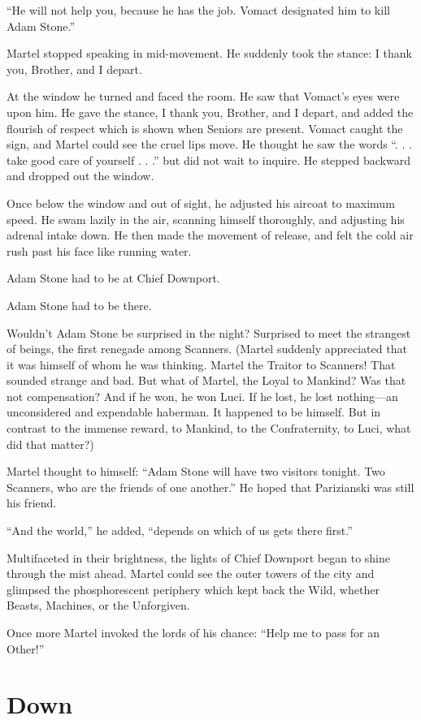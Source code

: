 ``He will not help you, because he has the job. Vomact designated him to kill Adam Stone.''

Martel stopped speaking in mid-movement. He suddenly took the stance: I thank you, Brother, and I depart.

At the window he turned and faced the room. He saw that Vomact's eyes were upon him. He gave the stance, I thank you, Brother, and I depart, and added the flourish of respect which is shown when Seniors are present. Vomact caught the sign, and Martel could see the cruel lips move. He thought he saw the words ``. . . take good care of yourself . . .'' but did not wait to inquire. He stepped backward and dropped out the window.

Once below the window and out of sight, he adjusted his aircoat to maximum speed. He swam lazily in the air, scanning himself thoroughly, and adjusting his adrenal intake down. He then made the movement of release, and felt the cold air rush past his face like running water.

Adam Stone had to be at Chief Downport.

Adam Stone had to be there.

Wouldn't Adam Stone be surprised in the night? Surprised to meet the strangest of beings, the first renegade among Scanners. (Martel suddenly appreciated that it was himself of whom he was thinking. Martel the Traitor to Scanners! That sounded strange and bad. But what of Martel, the Loyal to Mankind? Was that not compensation? And if he won, he won Luci. If he lost, he lost nothing---an unconsidered and expendable haberman. It happened to be himself. But in contrast to the immense reward, to Mankind, to the Confraternity, to Luci, what did that matter?)

Martel thought to himself: ``Adam Stone will have two visitors tonight. Two Scanners, who are the friends of one another.'' He hoped that Parizianski was still his friend.

``And the world,'' he added, ``depends on which of us gets there first.''

Multifaceted in their brightness, the lights of Chief Downport began to shine through the mist ahead. Martel could see the outer towers of the city and glimpsed the phosphorescent periphery which kept back the Wild, whether Beasts, Machines, or the Unforgiven.

Once more Martel invoked the lords of his chance: ``Help me to pass for an Other!''

 
\section{Down}

